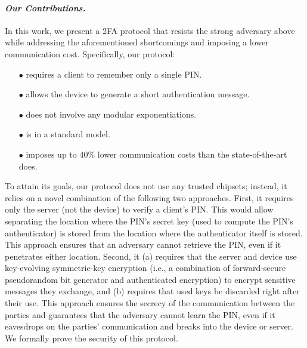 \vspace{-2mm}
\paragraph{\textbf{\textit{Our Contributions.}}}  In this work, we present a 2FA protocol that resists the strong adversary above while addressing the aforementioned shortcomings and imposing a lower communication cost. Specifically, our protocol:

\vspace{-2mm}
\begin{itemize}
\item[$\bullet$] requires a client to remember only a single PIN.

\item[$\bullet$] {allows the device to generate a short authentication message.} 

\item[$\bullet$] does not involve any modular exponentiations.

\item[$\bullet$] is in a standard model.

\item[$\bullet$]  imposes up to $40\%$ lower communication costs than the state-of-the-art does. 


\end{itemize}


 To attain its goals, our protocol does not use any trusted chipsets; instead, it relies on a novel combination of the following two approaches. First, it requires only the server  (not the device) to verify a client’s PIN. This would allow separating the location where the PIN’s secret key (used to compute the PIN’s authenticator) is stored from the location where the authenticator itself is stored. This approach ensures that an adversary cannot retrieve the PIN, even if it penetrates either location.  Second, it  (a) requires that the server and device use key-evolving symmetric-key encryption (i.e., a combination of forward-secure pseudorandom bit generator and authenticated encryption) to encrypt sensitive messages they exchange,  and (b) requires that used keys be discarded right after their use. This approach ensures the secrecy of the communication between the parties and guarantees that the adversary cannot learn the PIN, even if it eavesdrops on the parties' communication and breaks into the device or server. We formally prove the security of this protocol. 





